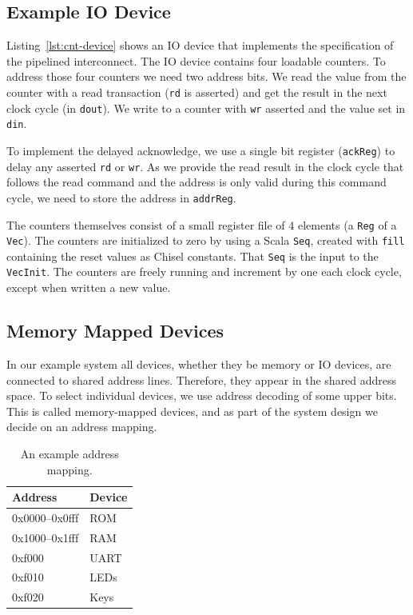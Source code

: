 \documentclass[%
    10pt,
    headinclude, footexclude,
    openright, %
    notitlepage,
    cleardoubleempty,
    headsepline,
    pointlessnumbers,
    bibtotoc, idxtotoc,
    ]{scrbook}
\newcommand{\code}[1]{{\lstinline[basicstyle=\small\ttfamily]{#1}}}
\begin{document}
\subsection{Example IO Device}


Listing~\ref{lst:cnt-device} shows an IO device that implements the specification of the
pipelined interconnect. The IO device contains four loadable counters. To address those four
counters we need two address bits. We read the value from the counter with a read transaction
(\code{rd} is asserted) and get the result in the next clock cycle (in \code{dout}). We write to a counter with
\code{wr} asserted and the value set in \code{din}.

To implement the delayed acknowledge, we use a single bit register (\code{ackReg}) to
delay any asserted \code{rd} or \code{wr}. As we provide the read result in
the clock cycle that follows the read command and the address is only valid during this
command cycle, we need to store the address in \code{addrReg}.

The counters themselves consist of a small register file of 4 elements (a \code{Reg} of a \code{Vec}).
The counters are initialized to zero by using a Scala \code{Seq}, created with \code{fill}
containing the reset values as Chisel constants. That \code{Seq} is the input to the \code{VecInit}.
The counters are freely running and increment by one each clock cycle, except when written
a new value.

\subsection{Memory Mapped Devices}

In our example system all devices, whether they be memory or IO devices, are connected to shared
address lines. Therefore, they appear in the shared address space. To select individual
devices, we use address decoding of some upper bits. This is called memory-mapped devices,
and as part of the system design we decide on an address mapping.

\begin{table}
\centering
\begin{tabular}{ll}
\toprule
Address & Device \\
\midrule
0x0000--0x0fff & ROM \\
0x1000--0x1fff & RAM \\
0xf000 & UART \\
0xf010 & LEDs \\
0xf020 & Keys \\
\bottomrule
\end{tabular}
\caption{An example address mapping.}
\label{tab:addr:map}
\end{table}
\end{document}
